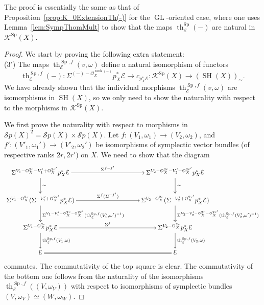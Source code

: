 \documentclass[10pt]{amsart}
\theoremstyle{definition}
\theoremstyle{plain}
\numberwithin{equation}{section}
\newcommand{\0}{\emptyset}
\newcommand{\sE}{{\mathcal E}}
\newcommand{\sK}{{\mathcal K}}
\newcommand{\sO}{{\mathcal O}}
\newcommand{\sS}{{\mathcal S}}
\newcommand{\GL}{{\operatorname{GL}}}
\newcommand{\Sp}{{\operatorname{Sp}}}
\newcommand{\SH}{{\operatorname{SH}}}
\renewcommand{\th}{{\operatorname{th}}}
\newcommand{\rnk}{{\operatorname{rank}}}
\begin{document}
The proof is essentially the same as that of Proposition~\ref{prop:K_0ExtensionTh(-)} for the $\GL$-oriented case, where one uses
Lemma~\ref{lem:SympThomMult} to show that the maps $\th^{\Sp}_{\sE}(-)$  are natural in $\sK^\Sp(X)$.

\begin{proof}
 We start by proving the following extra statement: \\[5pt]
(3${}'$) The maps $\th^{\Sp,f}_{\sE}(v, \omega)$ define a natural isomorphism of functors
\[
\th^{\Sp,f}_{\sE}(-):\Sigma^{(-)-\sO_X^{\rnk(-)}}p^*_X\sE\to c_{p_X^*\sE}:\sK^\Sp(X)\to (\SH(X))_\simeq. 
\]
We have already shown that the individual morphisms $\th^{\Sp,f}_{\sE}(v,\omega)$ are isomorphisms in $\SH(X)$, so we only need to show the naturality with respect to the morphisms in $\sK^\Sp(X)$. 

We first prove the naturality with respect to morphisms in $\sS{p}(X)^2=\sS{p}(X) \times \sS{p}(X)$. Let $f:(V_1,\omega_1)\to (V_2,\omega_2)$, and $f':(V'_1,\omega_1')\to (V'_2,\omega_2')$ be isomorphisms of symplectic vector bundles (of respective ranks $2r,2r'$) on $X$. We need to show that the diagram
\[
\xymatrixcolsep{100pt}
\xymatrix{
\Sigma^{V_1-\sO_X^{2r}-V_1'+\sO_X^{2r'}}p_X^*\sE\ar[d]^-\sim\ar[r]^{\Sigma^{f-f'}}&
\Sigma^{V_2-\sO_X^{2r}-V_2'+\sO_X^{2r'}}p_X^*\sE\ar[d]^-\sim\\
\Sigma^{V_1-\sO_X^{2r}}(\Sigma^{-V_1'+\sO_X^{2r'}}p_X^*\sE)\ar[d]^{\Sigma^{V_1-V_1'-\sO_X^{2r}-\sO_X^{2r'}}(\th^{\Sp,f}_{\sE}(V_1',\omega')^{-1})}\ar[r]^{\Sigma^f(\Sigma^{-f'})}&
\Sigma^{V_2-\sO_X^{2r}}(\Sigma^{-V_2'+\sO_X^{2r'}}p_X^*\sE)\ar[d]^{\Sigma^{V_2-V_2'-\sO_X^{2r}-\sO_X^{2r'}}(\th^{\Sp,f}_{\sE}(V_2',\omega')^{-1})}\\
\Sigma^{V_1-\sO_X^{2r}}p_X^*\sE\ar[d]^{\th^{\Sp,f}_{\sE}(V_1,\omega)}\ar[r]^{\Sigma^f}&
\Sigma^{V_2-\sO_X^{2r}}p_X^*\sE\ar[d]^{\th^{\Sp,f}_{\sE}(V_2,\omega)}\\
\sE\ar@{=}[r]&\sE
}
\]
commutes. The commutativity of the top square is clear. The commutativity of the bottom one follows from the naturality of the isomorphisms $\th^{\Sp,f}_{\sE}((V,\omega_V))$ with respect to isomorphisms of symplectic bundles $(V,\omega_V)\simeq (W,\omega_W)$.


\end{proof}
\end{document}
